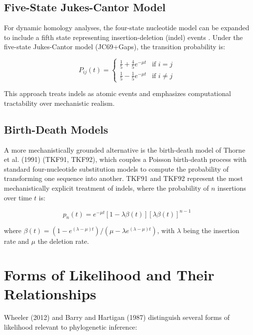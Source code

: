 \subsection{Five-State Jukes-Cantor Model}

For dynamic homology analyses, the four-state nucleotide model can be expanded to include a fifth state representing insertion-deletion (indel) events \parencite{wheeler2006,mcguire2001}. Under the five-state Jukes-Cantor model (JC69+Gaps), the transition probability is:

$$P_{ij}(t) = \begin{cases} \frac{1}{5} + \frac{4}{5} e^{-\mu t} & \text{if } i = j \\ \frac{1}{5} - \frac{1}{5} e^{-\mu t} & \text{if } i \neq j \end{cases}$$

This approach treats indels as atomic events and emphasizes computational tractability over mechanistic realism.

\subsection{Birth-Death Models}

A more mechanistically grounded alternative is the birth-death model of Thorne et al. (1991) (TKF91, TKF92), which couples a Poisson birth-death process with standard four-nucleotide substitution models to compute the probability of transforming one sequence into another. TKF91 and TKF92 represent the most mechanistically explicit treatment of indels, where the probability of $n$ insertions over time $t$ is:

$$p_n(t) = e^{-\mu t}\left[1 - \lambda\beta(t)\right] \left[\lambda\beta(t)\right]^{n-1}$$

where $\beta(t) = (1 - e^{(\lambda-\mu)t})/(\mu - \lambda e^{(\lambda-\mu)t})$, with $\lambda$ being the insertion rate and $\mu$ the deletion rate.

\section{Forms of Likelihood and Their Relationships}

Wheeler (2012) and Barry and Hartigan (1987) distinguish several forms of likelihood relevant to phylogenetic inference:

